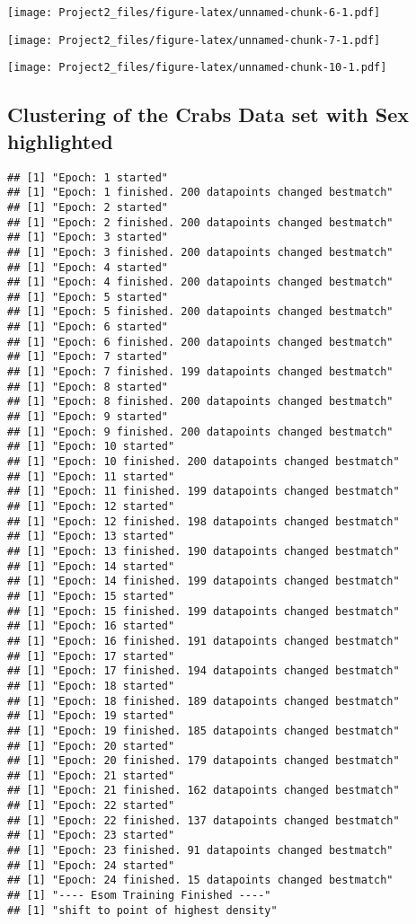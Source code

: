 \documentclass[
]{article}
\begin{document}
\texttt{[image: Project2\_files/figure-latex/unnamed-chunk-6-1.pdf]}

\texttt{[image: Project2\_files/figure-latex/unnamed-chunk-7-1.pdf]}

\texttt{[image: Project2\_files/figure-latex/unnamed-chunk-10-1.pdf]}

\subsection{Clustering of the Crabs Data set with Sex
highlighted}\label{clustering-of-the-crabs-data-set-with-sex-highlighted}

\begin{verbatim}
## [1] "Epoch: 1 started"
## [1] "Epoch: 1 finished. 200 datapoints changed bestmatch"
## [1] "Epoch: 2 started"
## [1] "Epoch: 2 finished. 200 datapoints changed bestmatch"
## [1] "Epoch: 3 started"
## [1] "Epoch: 3 finished. 200 datapoints changed bestmatch"
## [1] "Epoch: 4 started"
## [1] "Epoch: 4 finished. 200 datapoints changed bestmatch"
## [1] "Epoch: 5 started"
## [1] "Epoch: 5 finished. 200 datapoints changed bestmatch"
## [1] "Epoch: 6 started"
## [1] "Epoch: 6 finished. 200 datapoints changed bestmatch"
## [1] "Epoch: 7 started"
## [1] "Epoch: 7 finished. 199 datapoints changed bestmatch"
## [1] "Epoch: 8 started"
## [1] "Epoch: 8 finished. 200 datapoints changed bestmatch"
## [1] "Epoch: 9 started"
## [1] "Epoch: 9 finished. 200 datapoints changed bestmatch"
## [1] "Epoch: 10 started"
## [1] "Epoch: 10 finished. 200 datapoints changed bestmatch"
## [1] "Epoch: 11 started"
## [1] "Epoch: 11 finished. 199 datapoints changed bestmatch"
## [1] "Epoch: 12 started"
## [1] "Epoch: 12 finished. 198 datapoints changed bestmatch"
## [1] "Epoch: 13 started"
## [1] "Epoch: 13 finished. 190 datapoints changed bestmatch"
## [1] "Epoch: 14 started"
## [1] "Epoch: 14 finished. 199 datapoints changed bestmatch"
## [1] "Epoch: 15 started"
## [1] "Epoch: 15 finished. 199 datapoints changed bestmatch"
## [1] "Epoch: 16 started"
## [1] "Epoch: 16 finished. 191 datapoints changed bestmatch"
## [1] "Epoch: 17 started"
## [1] "Epoch: 17 finished. 194 datapoints changed bestmatch"
## [1] "Epoch: 18 started"
## [1] "Epoch: 18 finished. 189 datapoints changed bestmatch"
## [1] "Epoch: 19 started"
## [1] "Epoch: 19 finished. 185 datapoints changed bestmatch"
## [1] "Epoch: 20 started"
## [1] "Epoch: 20 finished. 179 datapoints changed bestmatch"
## [1] "Epoch: 21 started"
## [1] "Epoch: 21 finished. 162 datapoints changed bestmatch"
## [1] "Epoch: 22 started"
## [1] "Epoch: 22 finished. 137 datapoints changed bestmatch"
## [1] "Epoch: 23 started"
## [1] "Epoch: 23 finished. 91 datapoints changed bestmatch"
## [1] "Epoch: 24 started"
## [1] "Epoch: 24 finished. 15 datapoints changed bestmatch"
## [1] "---- Esom Training Finished ----"
## [1] "shift to point of highest density"
\end{verbatim}
\end{document}
